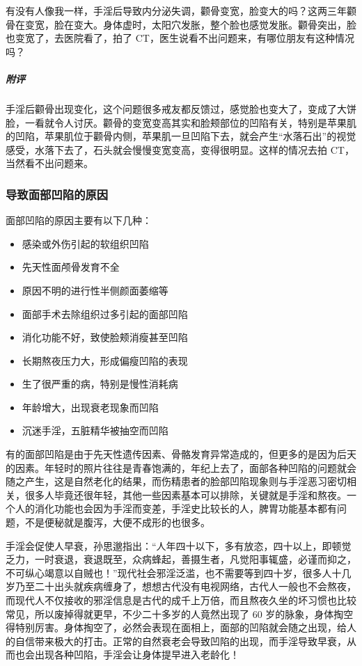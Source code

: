 \begin{case}[面部凹陷]
    有没有人像我一样，手淫后导致内分泌失调，颧骨变宽，脸变大的吗？这两三年颧骨在变宽，脸在变大。身体虚时，太阳穴发胀，整个脸也感觉发胀。颧骨突出，脸也变宽了，去医院看了，拍了 CT，医生说看不出问题来，有哪位朋友有这种情况吗？
    \subparagraph{附评} 手淫后颧骨出现变化，这个问题很多戒友都反馈过，感觉脸也变大了，变成了大饼脸，一看就令人讨厌。颧骨的变宽变高其实和脸颊部位的凹陷有关，特别是苹果肌的凹陷，苹果肌位于颧骨内侧，苹果肌一旦凹陷下去，就会产生“水落石出”的视觉感受，水落下去了，石头就会慢慢变宽变高，变得很明显。这样的情况去拍 CT，当然看不出问题来。
\end{case}

\subsubsection{导致面部凹陷的原因}

面部凹陷的原因主要有以下几种：

\begin{multicols}{2}
    \begin{itemize}
        \item 感染或外伤引起的软组织凹陷
        \item 先天性面颅骨发育不全
        \item 原因不明的进行性半侧颜面萎缩等
        \item 面部手术去除组织过多引起的面部凹陷
        \item 消化功能不好，致使脸颊消瘦甚至凹陷
        \item 长期熬夜压力大，形成偏瘦凹陷的表现
        \item 生了很严重的病，特别是慢性消耗病
        \item 年龄增大，出现衰老现象而凹陷
        \item 沉迷手淫，五脏精华被抽空而凹陷
    \end{itemize}
\end{multicols}

有的面部凹陷是由于先天性遗传因素、骨骼发育异常造成的，但更多的是因为后天的因素。年轻时的照片往往是青春饱满的，年纪上去了，面部各种凹陷的问题就会随之产生，这是自然老化的结果，而伤精患者的脸部凹陷现象则与手淫恶习密切相关，很多人毕竟还很年轻，其他一些因素基本可以排除，关键就是手淫和熬夜。一个人的消化功能也会因为手淫而变差，手淫史比较长的人，脾胃功能基本都有问题，不是便秘就是腹泻，大便不成形的也很多。

手淫会促使人早衰，孙思邈指出：“人年四十以下，多有放恣，四十以上，即顿觉乏力，一时衰退，衰退既至，众病蜂起，善摄生者，凡觉阳事辄盛，必谨而抑之，不可纵心竭意以自贼也！”现代社会邪淫泛滥，也不需要等到四十岁，很多人十几岁乃至二十出头就疾病缠身了，想想古代没有电视网络，古代人一般也不会熬夜，而现代人不仅接收的邪淫信息是古代的成千上万倍，而且熬夜久坐的坏习惯也比较常见，所以废掉得就更早，不少二十多岁的人竟然出现了 60 岁的脉象，身体掏空得特别厉害。身体掏空了，必然会表现在面相上，面部的凹陷就会随之出现，给人的自信带来极大的打击。正常的自然衰老会导致凹陷的出现，而手淫导致早衰，从而也会出现各种凹陷，手淫会让身体提早进入老龄化！

